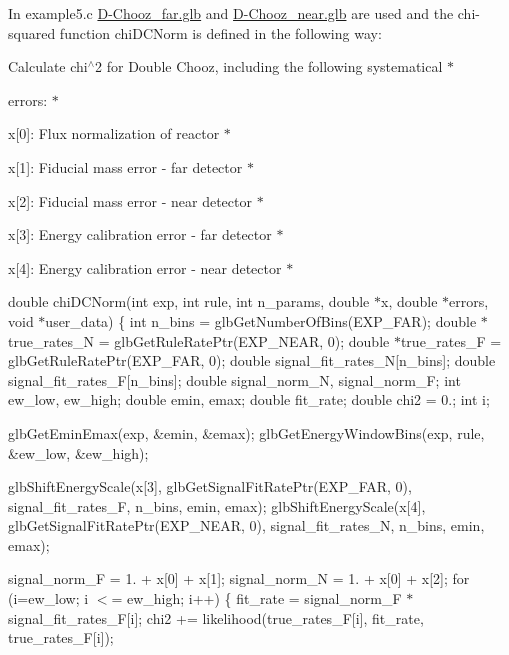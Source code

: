 In example5.\+c \hyperlink{D-Chooz__far_8glb}{D-\/\+Chooz\+\_\+far.\+glb} and \hyperlink{D-Chooz__near_8glb}{D-\/\+Chooz\+\_\+near.\+glb} are used and the chi-\/squared function chi\+D\+C\+Norm is defined in the following way\+:




\begin{DoxyItemize}
\item Calculate chi$^\wedge$2 for Double Chooz, including the following systematical $\ast$
\item errors\+: $\ast$
\item x\mbox{[}0\mbox{]}\+: Flux normalization of reactor $\ast$
\item x\mbox{[}1\mbox{]}\+: Fiducial mass error -\/ far detector $\ast$
\item x\mbox{[}2\mbox{]}\+: Fiducial mass error -\/ near detector $\ast$
\item x\mbox{[}3\mbox{]}\+: Energy calibration error -\/ far detector $\ast$
\item x\mbox{[}4\mbox{]}\+: Energy calibration error -\/ near detector $\ast$ 


\end{DoxyItemize}

double chi\+D\+C\+Norm(int exp, int rule, int n\+\_\+params, double $\ast$x, double $\ast$errors, void $\ast$user\+\_\+data) \{ int n\+\_\+bins = glb\+Get\+Number\+Of\+Bins(\+E\+X\+P\+\_\+\+F\+A\+R); double $\ast$true\+\_\+rates\+\_\+N = glb\+Get\+Rule\+Rate\+Ptr(\+E\+X\+P\+\_\+\+N\+E\+A\+R, 0); double $\ast$true\+\_\+rates\+\_\+F = glb\+Get\+Rule\+Rate\+Ptr(\+E\+X\+P\+\_\+\+F\+A\+R, 0); double signal\+\_\+fit\+\_\+rates\+\_\+N\mbox{[}n\+\_\+bins\mbox{]}; double signal\+\_\+fit\+\_\+rates\+\_\+F\mbox{[}n\+\_\+bins\mbox{]}; double signal\+\_\+norm\+\_\+N, signal\+\_\+norm\+\_\+F; int ew\+\_\+low, ew\+\_\+high; double emin, emax; double fit\+\_\+rate; double chi2 = 0.; int i;

glb\+Get\+Emin\+Emax(exp, \&emin, \&emax); glb\+Get\+Energy\+Window\+Bins(exp, rule, \&ew\+\_\+low, \&ew\+\_\+high);

glb\+Shift\+Energy\+Scale(x\mbox{[}3\mbox{]}, glb\+Get\+Signal\+Fit\+Rate\+Ptr(\+E\+X\+P\+\_\+\+F\+A\+R, 0), signal\+\_\+fit\+\_\+rates\+\_\+F, n\+\_\+bins, emin, emax); glb\+Shift\+Energy\+Scale(x\mbox{[}4\mbox{]}, glb\+Get\+Signal\+Fit\+Rate\+Ptr(\+E\+X\+P\+\_\+\+N\+E\+A\+R, 0), signal\+\_\+fit\+\_\+rates\+\_\+N, n\+\_\+bins, emin, emax);

signal\+\_\+norm\+\_\+F = 1. + x\mbox{[}0\mbox{]} + x\mbox{[}1\mbox{]}; signal\+\_\+norm\+\_\+N = 1. + x\mbox{[}0\mbox{]} + x\mbox{[}2\mbox{]}; for (i=ew\+\_\+low; i $<$= ew\+\_\+high; i++) \{ fit\+\_\+rate = signal\+\_\+norm\+\_\+F $\ast$ signal\+\_\+fit\+\_\+rates\+\_\+F\mbox{[}i\mbox{]}; chi2 += likelihood(true\+\_\+rates\+\_\+\+F\mbox{[}i\mbox{]}, fit\+\_\+rate, true\+\_\+rates\+\_\+\+F\mbox{[}i\mbox{]});

